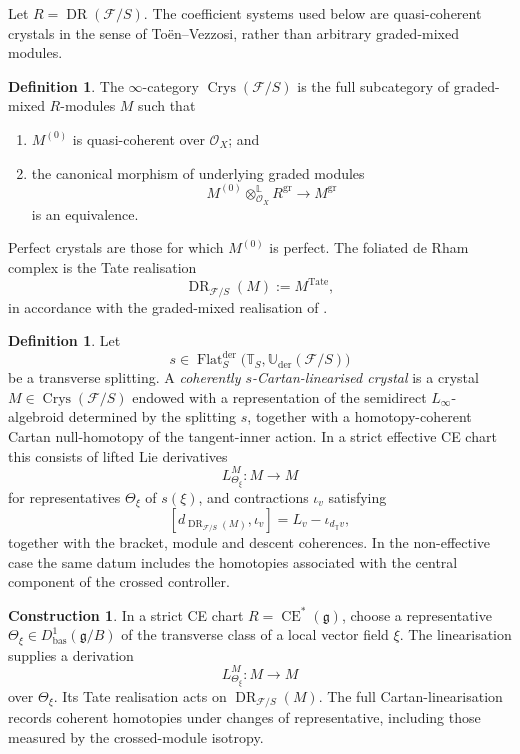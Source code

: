 \documentclass[11pt,reqno,a4paper,dvipsnames,x11names]{amsart}
\numberwithin{equation}{section}
\theoremstyle{plain}
\theoremstyle{definition}
\newtheorem{definition}[theorem]{Definition}
\newtheorem{construction}[theorem]{Construction}
\theoremstyle{remark}
\newcommand{\cO}{\mathcal{O}}
\DeclareMathOperator{\CE}{CE}
\DeclareMathOperator{\DR}{DR}
\DeclareMathOperator{\Crys}{Crys}
\newcommand{\cF}{\mathcal F}
\newcommand{\g}{\mathfrak g}
\newcommand{\Uder}{\mathbb U_{\mathrm{der}}}
\newcommand{\bbT}{\mathbb T}
\newcommand{\bas}{\mathrm{bas}}
\newcommand{\from}{\colon}
\newcommand{\Tate}{\mathrm{Tate}}
\begin{document}
Let \(R=\DR(\cF/S)\). The coefficient systems used below are quasi-coherent crystals in the sense of To\"en--Vezzosi, rather than arbitrary graded-mixed modules.

\begin{definition}\label{def:crystals}
The \(\infty\)-category \(\Crys(\cF/S)\) is the full subcategory of graded-mixed \(R\)-modules \(M\) such that
\begin{enumerate}[label=(\roman*)]
\item \(M^{(0)}\) is quasi-coherent over \(\cO_X\); and
\item the canonical morphism of underlying graded modules
\[
 M^{(0)}\otimes_{\cO_X}^{\mathbb L}R^{\mathrm{gr}}
 \longrightarrow M^{\mathrm{gr}}
\]
is an equivalence.
\end{enumerate}
Perfect crystals are those for which \(M^{(0)}\) is perfect. The foliated de Rham complex is the Tate realisation
\[
 \DR_{\cF/S}(M):=M^{\Tate},
\]
in accordance with the graded-mixed realisation of \cite{TV,TVRH}.
\end{definition}

\begin{definition}\label{def:linearised-crystal}
Let
\[
 s\in\operatorname{Flat}^{\mathrm{der}}_S
 \bigl(\bbT_S,\Uder(\cF/S)\bigr)
\]
be a transverse splitting. A \emph{coherently \(s\)-Cartan-linearised crystal} is a crystal
\(M\in\Crys(\cF/S)\) endowed with a representation of the semidirect
\(L_\infty\)-algebroid determined by the splitting \(s\), together with a homotopy-coherent Cartan null-homotopy of the tangent-inner action. In a strict effective CE chart this consists of lifted Lie derivatives
\[
 L^M_{\Theta_\xi}\from M\longrightarrow M
\]
for representatives \(\Theta_\xi\) of \(s(\xi)\), and contractions \(\iota_v\) satisfying
\[
 [d_{\DR_{\cF/S}(M)},\iota_v]
 =L_v-\iota_{d_{\bbT}v},
\]
together with the bracket, module and descent coherences. In the non-effective case the same datum includes the homotopies associated with the central component of the crossed controller.
\end{definition}

\begin{construction}\label{cons:GM-local-action}
In a strict CE chart \(R=\CE^*(\g)\), choose a representative
\(\Theta_\xi\in D^1_{\bas}(\g/B)\) of the transverse class of a local vector field \(\xi\). The linearisation supplies a derivation
\[
 L^M_{\Theta_\xi}\from M\longrightarrow M
\]
over \(\Theta_\xi\). Its Tate realisation acts on \(\DR_{\cF/S}(M)\). The full Cartan-linearisation records coherent homotopies under changes of representative, including those measured by the crossed-module isotropy.
\end{construction}
\end{document}
